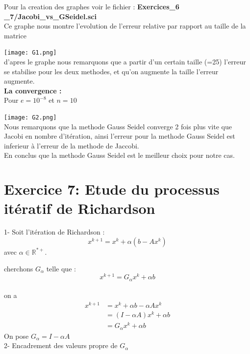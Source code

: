 \documentclass[12pt]{report}
\begin{document}
Pour la creation des graphes voir le fichier :\textbf{ Exercices\_6 \_7/Jacobi\_vs\_GSeidel.sci}\\


Ce graphe nous montre l'evolution de l'erreur relative par rapport au taille de la matrice

\texttt{[image: G1.png]}~\\
d'apres le graphe nous remarquons que a partir d'un certain taille (=25) l'erreur se stabilise pour les deux methodes, et qu'on augmente la taille l'erreur augmente.\\

\textbf{La convergence :}\\

Pour $e=10^{-8}$ et $n=10$

\texttt{[image: G2.png]}~\\

Nous remarquons que la methode Gauss Seidel converge 2 fois plus vite que Jacobi en nombre d'itération, ainsi l'erreur pour la methode Gauss Seidel est inferieur à l'erreur de la methode de Jaccobi.\\

En conclus que la methode Gauss Seidel est le meilleur choix pour notre cas. 


\section{Exercice 7: Etude du processus itératif de Richardson}

1- Soit l'itération de Richardson :
$$
x^{k+1}=x^{k}+\alpha\left(b-A x^{k}\right)
$$
avec $\alpha \in \mathbb{R}^{*+}$.

cherchons $G_{\alpha}$ telle que : 
$$
x^{k+1}=G_{\alpha}x^{k}+\alpha b
$$\\
on a
$$
\begin{aligned}
x^{k+1} &=x^{k}+\alpha b-\alpha A x^{k} \\
&=(I-\alpha A) x^{k}+\alpha b \\
&=G_{\alpha} x^{k}+\alpha b
\end{aligned}
$$
On pose $G_{\alpha}=I-\alpha A$\\

2- Encadrement des valeurs propre de $G_{\alpha}$\\
\end{document}
